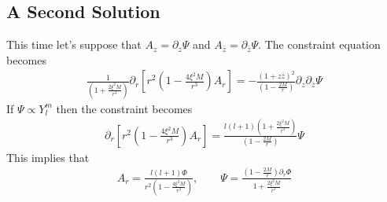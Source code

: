 \documentclass[12pt]{article}
\begin{document}
\subsection{A Second Solution}
This time let's suppose that $A_{z} = \partial_{z} \Psi$ and $A_{\bar{z}} = \partial_{\bar{z}} \Psi$. The constraint equation becomes
\begin{gather}
\frac{1}{(1 + \frac{2 \xi^{2} M}{r^{3}})}
\partial_{r}
\left[
r^{2}
(1 - \frac{4 \xi^{2} M}{r^{3}})
A_{r}
\right]
=
-\frac{(1 + z \bar{z})^{2}}{(1 - \frac{2 M}{r})}
\partial_{z} \partial_{\bar{z}} \Psi
\end{gather}
If $\Psi \propto Y_{l}^{m}$ then the constraint becomes
\begin{gather}
\partial_{r}
\left[
r^{2}
(1 - \frac{4 \xi^{2} M}{r^{3}})
A_{r}
\right]
=
\frac{l (l +1) (1 + \frac{2 \xi^{2} M}{r^{3}})}{(1 - \frac{2 M}{r})} \Psi
\end{gather}
This implies that 
\begin{gather}
A_{r} 
=
\frac{l (l +1) \Phi}{r^{2} (1 - \frac{4 \xi^{2} M}{r^{3}})}
,
\qquad
\Psi 
=
\frac{(1 - \frac{2 M}{r}) \partial_{r} \Phi}{1 + \frac{2 \xi^{2} M}{r^{3}}}
\end{gather}
\end{document}
